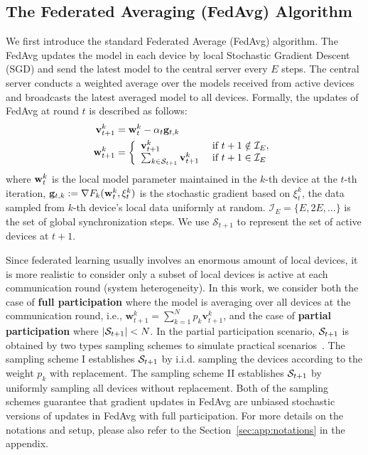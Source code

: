 \subsection{The Federated Averaging (FedAvg) Algorithm}
We first introduce the standard Federated Average (FedAvg) algorithm.
The FedAvg updates the model in each device by local Stochastic Gradient Descent (SGD) and send the latest model to the central server every $E$
steps. The central server conducts a weighted average over the models
received from active devices and broadcasts the latest averaged model to all devices.
Formally, the updates of FedAvg at round $t$ is described as follows:
\begin{align}
{\mathbf{v}}_{t+1}^{k} & ={\mathbf{w}}_{t}^{k}-\alpha_{t}{\mathbf{g}}_{t,k}\\
\mathbf{w}_{t+1}^{k} &=\left\{
\begin{array}{ll}
\mathbf{v}_{t+1}^{k} & \text { if } t+1 \notin \mathcal{I}_{E}, \\ 
\sum_{k \in {\mathcal{S}}_{t+1}} \mathbf{v}_{t+1}^{k} & \text { if } t+1 \in \mathcal{I}_{E}
\end{array}\right.
\end{align}
where ${\mathbf{w}}_t^k$ is the local model parameter maintained in the $k$-th device at the $t$-th iteration, ${\mathbf{g}}_{t,k}:=\nabla F_{k}({\mathbf{w}}_{t}^{k},\xi_{t}^{k})$ is the stochastic gradient based on $\xi_{t}^{k}$, the data sampled from $k$-th device’s local data uniformly at random. $\mathcal{I}_{E}=\{E,2E,\dots\}$ is the set of global synchronization steps. We use $\mathcal{S}_{t+1}$ to represent the set of active devices at $t+1$.

Since federated learning usually involves an enormous amount of 
local devices, it is more realistic to consider only a subset of 
local devices is active at each communication round (system heterogeneity). In this work,
we consider both the case of \textbf{full participation} where the model is
averaging over all devices at the communication round, i.e.,
$\mathbf{w}_{t+1}^{k} = \sum_{k=1}^N p_k \mathbf{v}_{t+1}^{k}$, and
the case of \textbf{partial participation} where $|{\mathcal{S}}_{t+1}| < N$. 
In the partial participation scenario, ${\mathcal{S}}_{t+1}$ is obtained by two types
sampling schemes to simulate practical scenarios~\cite{li2019convergence}. 
The sampling scheme I establishes ${\mathcal{S}}_{t+1}$ by i.i.d. sampling the devices according to
the weight $p_k$ with replacement. 
The sampling scheme II establishes ${\mathcal{S}}_{t+1}$ by uniformly sampling all devices without
replacement. Both of the sampling schemes
guarantee that gradient updates in FedAvg are unbiased stochastic versions of
updates in FedAvg with full participation. For 
more details on the notations and setup, please also refer to the Section~\ref{sec:app:notations} in the appendix.

